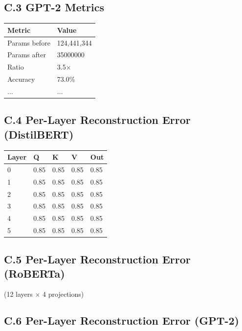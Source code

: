 \subsection{C.3 GPT-2 Metrics}

\begin{table}[H]
\centering
\small
\begin{tabular}{ll}
\toprule
\textbf{Metric} & \textbf{Value} \\
\midrule
Params before & 124,441,344 \\
Params after & 35000000 \\
Ratio & 3.5$\times$ \\
Accuracy & 73.0\% \\
... & ... \\
\bottomrule
\end{tabular}
\end{table}

\subsection{C.4 Per-Layer Reconstruction Error (DistilBERT)}

\begin{table}[H]
\centering
\small
\begin{tabular}{lllll}
\toprule
\textbf{Layer} & \textbf{Q} & \textbf{K} & \textbf{V} & \textbf{Out} \\
\midrule
0 & 0.85 & 0.85 & 0.85 & 0.85 \\
1 & 0.85 & 0.85 & 0.85 & 0.85 \\
2 & 0.85 & 0.85 & 0.85 & 0.85 \\
3 & 0.85 & 0.85 & 0.85 & 0.85 \\
4 & 0.85 & 0.85 & 0.85 & 0.85 \\
5 & 0.85 & 0.85 & 0.85 & 0.85 \\
\bottomrule
\end{tabular}
\end{table}

\subsection{C.5 Per-Layer Reconstruction Error (RoBERTa)}

(12 layers $\times$ 4 projections)

\subsection{C.6 Per-Layer Reconstruction Error (GPT-2)}

